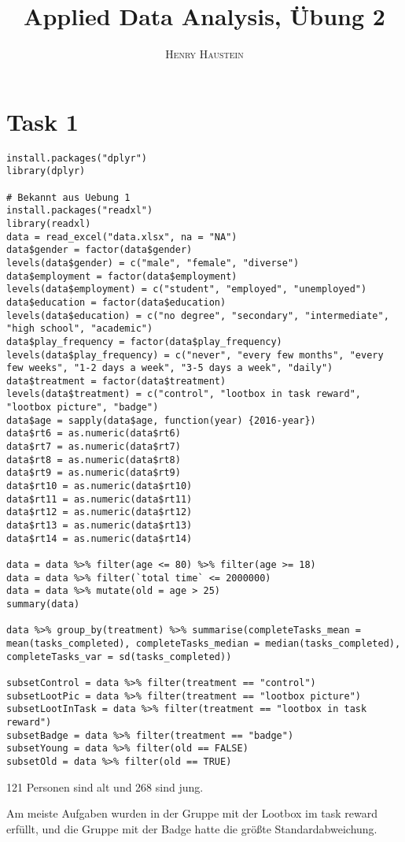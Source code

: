\documentclass{article}
\title{\textbf{Applied Data Analysis, Übung 2}}
\author{\textsc{Henry Haustein}}
\date{}
\begin{document}
	\maketitle
	
	\section*{Task 1}
	\begin{lstlisting}
install.packages("dplyr")
library(dplyr)

# Bekannt aus Uebung 1
install.packages("readxl")
library(readxl)
data = read_excel("data.xlsx", na = "NA")
data$gender = factor(data$gender)
levels(data$gender) = c("male", "female", "diverse")
data$employment = factor(data$employment)
levels(data$employment) = c("student", "employed", "unemployed")
data$education = factor(data$education)
levels(data$education) = c("no degree", "secondary", "intermediate", "high school", "academic")
data$play_frequency = factor(data$play_frequency)
levels(data$play_frequency) = c("never", "every few months", "every few weeks", "1-2 days a week", "3-5 days a week", "daily")
data$treatment = factor(data$treatment)
levels(data$treatment) = c("control", "lootbox in task reward", "lootbox picture", "badge")
data$age = sapply(data$age, function(year) {2016-year})
data$rt6 = as.numeric(data$rt6)
data$rt7 = as.numeric(data$rt7)
data$rt8 = as.numeric(data$rt8)
data$rt9 = as.numeric(data$rt9)
data$rt10 = as.numeric(data$rt10)
data$rt11 = as.numeric(data$rt11)
data$rt12 = as.numeric(data$rt12)
data$rt13 = as.numeric(data$rt13)
data$rt14 = as.numeric(data$rt14)

data = data %>% filter(age <= 80) %>% filter(age >= 18)
data = data %>% filter(`total time` <= 2000000)
data = data %>% mutate(old = age > 25)
summary(data)

data %>% group_by(treatment) %>% summarise(completeTasks_mean = mean(tasks_completed), completeTasks_median = median(tasks_completed), completeTasks_var = sd(tasks_completed))

subsetControl = data %>% filter(treatment == "control")
subsetLootPic = data %>% filter(treatment == "lootbox picture")
subsetLootInTask = data %>% filter(treatment == "lootbox in task reward")
subsetBadge = data %>% filter(treatment == "badge")
subsetYoung = data %>% filter(old == FALSE)
subsetOld = data %>% filter(old == TRUE)
	\end{lstlisting}
	121 Personen sind alt und 268 sind jung. 
	
	Am meiste Aufgaben wurden in der Gruppe mit der Lootbox im task reward erfüllt, und die Gruppe mit der Badge hatte die größte Standardabweichung.
\end{document}

